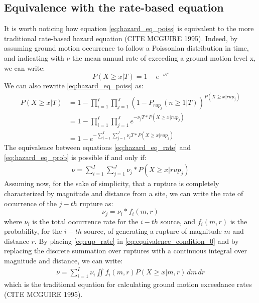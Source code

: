 \subsection{Equivalence with the rate-based equation}
It is worth noticing how equation \ref{eq:hazard_eq_poiss} is equivalent to the more traditional rate-based
hazard equation (CITE MCGUIRE 1995). Indeed, by assuming ground motion occurrence to follow a Poissonian
distribution in time, and indicating with $\nu$ the mean annual rate of exceeding a ground motion level x,
we can write:
\begin{equation}
\label{eq:hazard_eq_rate}
P(X \ge x | T) = 1 - e ^ {- \nu T}
\end{equation}
We can also rewrite \ref{eq:hazard_eq_poiss} as:
\begin{align}
\label{eq:hazard_eq_prob}
P(X \ge x | T) &= 1 - \prod_{i=1}^{I} \prod_{j=1}^{J} (1 - P_{rup_{j}}(n \ge 1 | T))^{P(X \ge x | rup_{j})} \nonumber \\
		      &= 1 - \prod_{i=1}^{I} \prod_{j=1}^{J} e^{-\nu_{j} T * P(X \ge x | rup_{j})} \nonumber \\
		      & = 1 - e ^ {- \sum_{i=1}^{I} \sum_{j=1}^{J} \nu_{j} T * P(X \ge x | rup_{j})}
\end{align}
The equivalence between equations \ref{eq:hazard_eq_rate} and \ref{eq:hazard_eq_prob} is possible if and only if:
\begin{align}
\label{eq:equivalence_condition_0}
\nu  =  \sum_{i=1}^{I} \sum_{j=1}^{J} \nu_{j} * P(X \ge x | rup_{j})
\end{align}
Assuming now, for the sake of simplicity, that a rupture is completely characterized by magnitude and distance from a site, we
can write the rate of occurrence of the $j-th$ rupture as:
\begin{equation}
\label{eq:rup_rate}
\nu_{j} = \nu_{i} * f_{i}(m, r)
\end{equation}
where $\nu_{i}$ is the total occurrence rate for the $i-th$ source, and $f_{i}(m, r)$ is the probability, for the $i-th$ source, of
generating a rupture of magnitude $m$ and distance $r$. By placing \ref{eq:rup_rate} in \ref{eq:equivalence_condition_0} and
by replacing the discrete summation over ruptures with a continuous integral over magnitude and distance, we can write:
\begin{align}
\nu = \sum_{i=1}^{I} \nu_{i} \iint f_{i}(m, r) P(X \ge x | m, r)\,dm \,dr
\end{align}
which is the traditional equation for calculating ground motion exceedance rates (CITE MCGUIRE 1995).

